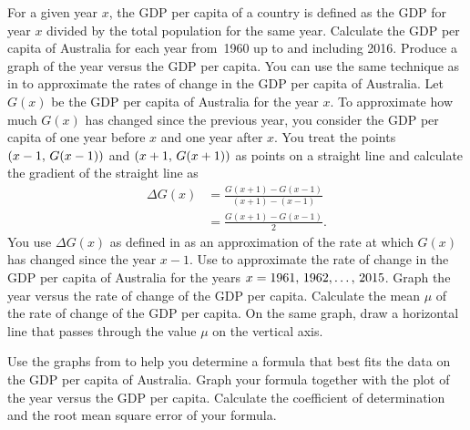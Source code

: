 \documentclass[a4paper,oneside,12pt]{article}
\begin{document}
\begin{problem}
\begin{packedenum}
  \item\label{subprob:logarithm:Australia_GDP_per_capita}
    For a given year $x$, the GDP per capita of a country is defined
    as the GDP for year $x$ divided by the total population for the
    same year.  Calculate the GDP per capita of Australia for each
    year from~1960 up to and including 2016.  Produce a graph of the
    year versus the GDP per capita.  You can use the same technique as
    in
    to approximate the rates of change in the GDP per capita of
    Australia.  Let $G(x)$ be the GDP per capita of Australia for the
    year $x$.  To approximate how much $G(x)$ has changed since the
    previous year, you consider the GDP per capita of one year before
    $x$ and one year after $x$.  You treat the points
    $\left\lparen{x-1},\, {G(x-1)}\right\rparen$ and $\left\lparen{x+1},\, {G(x+1)}\right\rparen$ as points on a
    straight line and calculate the gradient of the straight line as
    \begin{equation}
    \label{eqn:logarithm:Australia_GDP_per_capita_rates}
    \begin{aligned}
    \Delta G(x)
    &=
    \frac{
      G(x + 1) - G(x - 1)
    }{
      (x + 1) - (x - 1)
    } \\[4pt]
    &=
    \frac{
      G(x + 1) - G(x - 1)
    }{
      2
    }.
    \end{aligned}
    \end{equation}
    You use $\Delta G(x)$ as defined in
     as an
    approximation of the rate at which $G(x)$ has changed since the
    year $x - 1$.  Use
     to
    approximate the rate of change in the GDP per capita of Australia
    for the years $x = {1961},\, {1962}, \dots,\, {2015}$.  Graph the year versus
    the rate of change of the GDP per capita.  Calculate the mean
    $\mu$ of the rate of change of the GDP per capita.  On the same
    graph, draw a horizontal line that passes through the value $\mu$
    on the vertical axis.

  \item\label{subprob:logarithm:Australia_GDP_per_capita_formula}
    Use the graphs
    from  to help you
    determine a formula that best fits the data on the GDP per capita
    of Australia.  Graph your formula together with the plot of the
    year versus the GDP per capita.  Calculate the coefficient of
    determination and the root mean square error of your formula.


\end{packedenum}
\end{problem}
\end{document}
